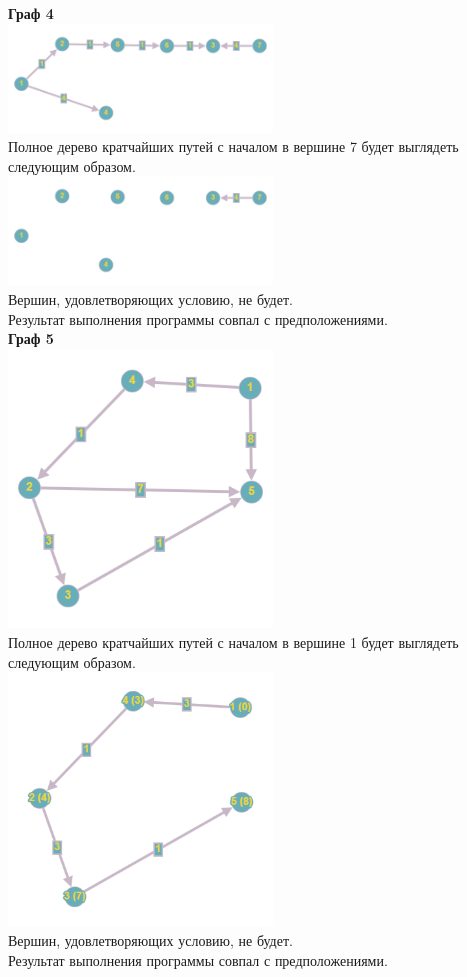 \documentclass[a4paper,14pt]{extarticle}
\begin{document}
\begin{enumerate}[1.]
        \textbf{Граф 4}\\
        \includegraphics[width=70mm]{testTree4Before}\\
        Полное дерево кратчайших путей с началом в вершине 7 будет выглядеть следующим образом.\\
        \includegraphics[width=70mm]{testTree4After}\\
        Вершин, удовлетворяющих условию, не будет.\\
        Результат выполнения программы совпал с предположениями.\\

        \textbf{Граф 5}\\
        \includegraphics[width=70mm]{testTree5Before}\\
        Полное дерево кратчайших путей с началом в вершине 1 будет выглядеть следующим образом.\\
        \includegraphics[width=70mm]{testTree5After}\\
        Вершин, удовлетворяющих условию, не будет.\\
        Результат выполнения программы совпал с предположениями.\\


\end{enumerate}
\end{document}
